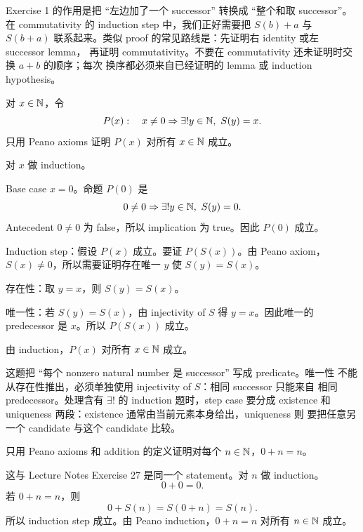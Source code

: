 \begin{explanation}
Exercise 1 的作用是把 ``左边加了一个 successor'' 转换成 ``整个和取 successor''。
在 commutativity 的 induction step 中，我们正好需要把 \(S(b)+a\) 与 \(S(b+a)\)
联系起来。类似 proof 的常见路线是：先证明右 identity 或左 successor lemma，
再证明 commutativity。不要在 commutativity 还未证明时交换 \(a+b\) 的顺序；每次
换序都必须来自已经证明的 lemma 或 induction hypothesis。
\end{explanation}

\begin{exerciseblock}
对 \(x\in\mathbb{N}\)，令
\[
P(x):\quad x\neq0\Rightarrow \exists!y\in\N,\ S(y)=x.
\]
只用 Peano axioms 证明 \(P(x)\) 对所有 \(x\in\mathbb{N}\) 成立。
\end{exerciseblock}

\begin{solution}
对 \(x\) 做 induction。

Base case \(x=0\)。命题 \(P(0)\) 是
\[
0\neq0\Rightarrow \exists!y\in\N,\ S(y)=0.
\]
Antecedent \(0\neq0\) 为 false，所以 implication 为 true。因此 \(P(0)\)
成立。

Induction step：假设 \(P(x)\) 成立。要证 \(P(S(x))\)。由 Peano axiom，
\(S(x)\neq0\)，所以需要证明存在唯一 \(y\) 使 \(S(y)=S(x)\)。

存在性：取 \(y=x\)，则 \(S(y)=S(x)\)。

唯一性：若 \(S(y)=S(x)\)，由 injectivity of \(S\) 得 \(y=x\)。因此唯一的
predecessor 是 \(x\)。所以 \(P(S(x))\) 成立。

由 induction，\(P(x)\) 对所有 \(x\in\mathbb{N}\) 成立。
\end{solution}

\begin{explanation}
这题把 ``每个 nonzero natural number 是 successor'' 写成 predicate。唯一性
不能从存在性推出，必须单独使用 injectivity of \(S\)：相同 successor 只能来自
相同 predecessor。处理含有 \(\exists!\) 的 induction 题时，step case 要分成
existence 和 uniqueness 两段：existence 通常由当前元素本身给出，uniqueness 则
要把任意另一个 candidate 与这个 candidate 比较。
\end{explanation}

\begin{exerciseblock}
只用 Peano axioms 和 addition 的定义证明对每个 \(n\in\mathbb{N}\)，\(0+n=n\)。
\end{exerciseblock}

\begin{solution}
这与 Lecture Notes Exercise 27 是同一个 statement。对 \(n\) 做 induction。
\[
0+0=0.
\]
若 \(0+n=n\)，则
\[
0+S(n)=S(0+n)=S(n).
\]
所以 induction step 成立。由 Peano induction，\(0+n=n\) 对所有 \(n\in\mathbb{N}\)
成立。
\end{solution}

